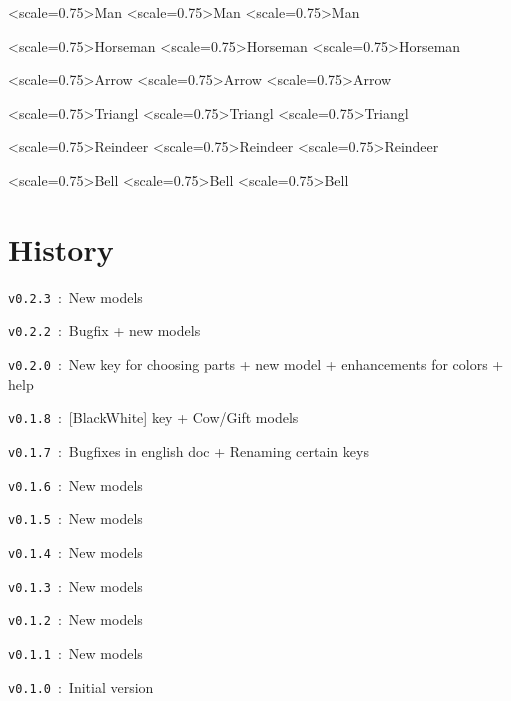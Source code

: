 \documentclass{article}
\begin{document}
\begin{PresentationCode}{}
\end{PresentationCode}

\begin{PresentationCode}{}
\TangramTikz<scale=0.75>{Man}
\TangramTikz[Solution]<scale=0.75>{Man}
\TangramTikz[ColorSolution]<scale=0.75>{Man}
\end{PresentationCode}

\begin{PresentationCode}{}
\TangramTikz<scale=0.75>{Horseman}
\TangramTikz[Solution]<scale=0.75>{Horseman}
\TangramTikz[ColorSolution]<scale=0.75>{Horseman}
\end{PresentationCode}

\begin{PresentationCode}{}
\TangramTikz<scale=0.75>{Arrow}
\TangramTikz[Solution]<scale=0.75>{Arrow}
\TangramTikz[ColorSolution]<scale=0.75>{Arrow}
\end{PresentationCode}

\begin{PresentationCode}{}
\TangramTikz<scale=0.75>{Triangl}
\TangramTikz[Solution]<scale=0.75>{Triangl}
\TangramTikz[ColorSolution]<scale=0.75>{Triangl}
\end{PresentationCode}

\begin{PresentationCode}{}
\TangramTikz<scale=0.75>{Reindeer}
\TangramTikz[Solution]<scale=0.75>{Reindeer}
\TangramTikz[ColorSolution]<scale=0.75>{Reindeer}
\end{PresentationCode}

\begin{PresentationCode}{}
\TangramTikz<scale=0.75>{Bell}
\TangramTikz[Solution]<scale=0.75>{Bell}
\TangramTikz[ColorSolution]<scale=0.75>{Bell}
\end{PresentationCode}

\newpage

\part{History}

\verb|v0.2.3|~:~New models

\verb|v0.2.2|~:~Bugfix + new models

\verb|v0.2.0|~:~New key for choosing parts + new model + enhancements for colors + help

\verb|v0.1.8|~:~\textsf{[BlackWhite]} key + \textsf{Cow}/\textsf{Gift} models

\verb|v0.1.7|~:~Bugfixes in english doc + Renaming certain keys

\verb|v0.1.6|~:~New models

\verb|v0.1.5|~:~New models

\verb|v0.1.4|~:~New models

\verb|v0.1.3|~:~New models

\verb|v0.1.2|~:~New models

\verb|v0.1.1|~:~New models

\verb|v0.1.0|~:~Initial version
\end{document}

